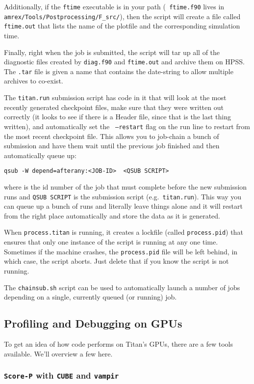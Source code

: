 Additionally, if the {\tt ftime} executable is in your path ({\tt
ftime.f90} lives in {\tt amrex/Tools/Postprocessing/F\_src/}), then
the script will create a file called {\tt ftime.out} that lists the
name of the plotfile and the corresponding simulation time.

Finally, right when the job is submitted, the script will tar up all
of the diagnostic files created by {\tt diag.f90} and {\tt ftime.out}
and archive them on HPSS.  The {\tt .tar} file is given a name that
contains the date-string to allow multiple archives to co-exist.

The {\tt titan.run} submission script has code in it that will look at
the most recently generated checkpoint files, make sure that they were
written out correctly (it looks to see if there is a Header file,
since that is the last thing written), and automatically set the {\tt
--restart} flag on the run line to restart from the most recent
checkpoint file.  This allows you to job-chain a bunch of submission
and have them wait until the previous job finished and then
automatically queue up:
\begin{verbatim}
qsub -W depend=afterany:<JOB-ID>  <QSUB SCRIPT>
\end{verbatim}
where {\tt <JOB-ID>} is the id number of the job that must complete
before the new submission runs and {\tt QSUB SCRIPT} is the submission
script (e.g.\ {\tt titan.run}).  This way you can queue up a bunch of
runs and literally leave things alone and it will restart from the
right place automatically and store the data as it is generated.

When {\tt process.titan} is running, it creates a lockfile (called
{\tt process.pid}) that ensures that only one instance of the script
is running at any one time.  Sometimes if the machine crashes, the
{\tt process.pid} file will be left behind, in which case, the script
aborts.  Just delete that if you know the script is not running.

The {\tt chainsub.sh} script can be used to automatically launch a
number of jobs depending on a single, currently queued (or running)
job.

\subsection{Profiling and Debugging on GPUs}
To get an idea of how code performs on Titan's GPUs, there are a few tools
available.  We'll overview a few here.

\subsubsection{{\tt Score-P} with {\tt CUBE} and {\tt vampir}}

